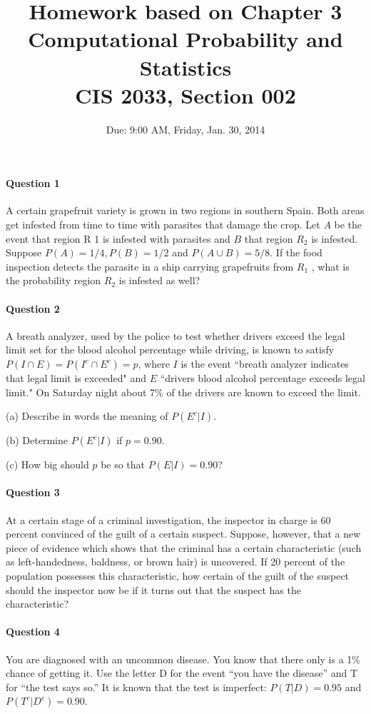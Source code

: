 \documentclass[11pt]{article} %
\title{Homework based on Chapter 3\\
Computational Probability and Statistics \\
CIS 2033, Section 002}
\author{Due: 9:00 AM, Friday, Jan. 30, 2014}
\date{} %
\begin{document}
\maketitle

\paragraph*{Question 1}
A certain grapefruit variety is grown in two regions in southern Spain. Both areas get infested from time to time with parasites that damage the crop. Let $A$ be the event that region R 1 is infested with parasites and $B$ that region $R_2$ is infested. Suppose $P (A) = 1/4, P (B) = 1/2$ and $P (A \cup B) = 5/8.$ If the food inspection detects the parasite in a ship carrying grapefruits from $R_1$ , what is the probability region $R_2$ is infested as well?
\paragraph*{Question 2}
A breath analyzer, used by the police to test whether drivers exceed the legal limit set for the blood alcohol percentage while driving, is known to satisfy $P(I \cap E) = P(I^c \cap E^c) = p$, where $I$ is the event ``breath analyzer indicates that legal limit is exceeded" and $E$ ``drivers blood alcohol percentage exceeds legal limit." On Saturday night about 7\% of the drivers are known to exceed the limit.

(a) Describe in words the meaning of $P(E^c | I)$. 

(b) Determine $P(E^c | I)$ if $p = 0.90$.

(c) How big should $p$ be so that $P(E | I) = 0.90$?

\paragraph*{Question 3}
At a certain stage of a criminal investigation, the inspector in charge is 60 percent convinced of the guilt of a certain suspect. Suppose, however, that a new piece of evidence which shows that the criminal has a certain characteristic (such as left-handedness, baldness, or brown hair) is uncovered. If 20 percent of the population possesses this characteristic, how certain of the guilt of the suspect should the inspector now be if it turns out that the suspect has the characteristic?

\paragraph*{Question 4}
You are diagnosed with an uncommon disease. You know that there only is a 1\% chance of getting it. Use the letter D for the event “you have the disease” and T for “the test says so.” It is known that the test is imperfect: $P (T | D) = 0.95$ and $P (T^c | D^c ) = 0.90$.
\end{document}
